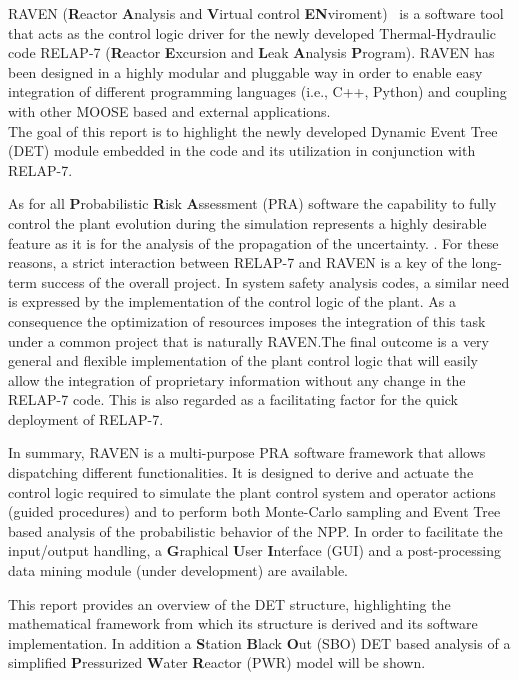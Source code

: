 \label{sec:introduction}
RAVEN (\textbf{R}eactor \textbf{A}nalysis and \textbf{V}irtual control \textbf{EN}viroment)~\cite{ravenFY12,mandelliANS2012} is a software tool that acts as the control logic driver for the newly developed Thermal-Hydraulic code RELAP-7  (\textbf{R}eactor \textbf{E}xcursion and \textbf{L}eak \textbf{A}nalysis \textbf{P}rogram). 
RAVEN has been designed in a highly modular and pluggable way in order to enable easy integration of different programming languages (i.e., C++, Python) and coupling with other MOOSE based and external applications.
\\The goal of this report is to highlight the newly developed  Dynamic Event Tree (DET) module embedded in the code and its utilization in conjunction with RELAP-7. 

As for all \textbf{P}robabilistic \textbf{R}isk \textbf{A}ssessment (PRA) software the capability to fully control the plant evolution during the simulation represents a highly desirable feature as it is for the analysis of the propagation of the uncertainty. . For these reasons, a strict interaction between RELAP-7 and RAVEN is a key of the long-term success of the overall project. In system safety analysis codes, a similar need is expressed by the implementation of the control logic of the plant. As a consequence the optimization of resources imposes the integration of this task under a common project that is naturally RAVEN.The final outcome is a very general and flexible implementation of the plant control logic that will easily allow the integration of proprietary information without any change in the RELAP-7 code. This is also regarded as a facilitating factor for the quick deployment of RELAP-7.

In summary, RAVEN is a multi-purpose PRA software framework that allows dispatching different functionalities. 
It is designed to derive and actuate the control logic required to simulate the plant control system and operator actions (guided procedures) and to perform both Monte-Carlo sampling  and Event Tree based analysis of the probabilistic behavior of the NPP. 
In order to facilitate the input/output handling, a \textbf{G}raphical \textbf{U}ser \textbf{I}nterface (GUI) and a post-processing data mining module (under development) are available.

This report provides an overview of the DET structure, highlighting the mathematical framework from which its structure is derived and its software implementation. In addition a \textbf{S}tation \textbf{B}lack \textbf{O}ut (SBO) DET based analysis of a simplified \textbf{P}ressurized \textbf{W}ater \textbf{R}eactor (PWR) model will be shown.
\vspace{-5mm}



